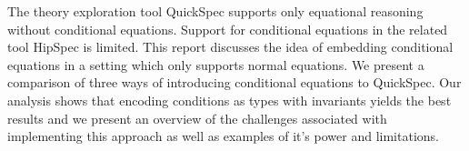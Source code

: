 The theory exploration tool QuickSpec
supports only equational reasoning without
conditional equations. Support for conditional
equations in the related tool HipSpec is limited.
This report discusses the idea of embedding conditional
equations in a setting which only supports normal equations.
We present a comparison of three ways of introducing
conditional equations to QuickSpec.
Our analysis shows that encoding conditions as types with invariants 
yields the best results and we present an overview of
the challenges associated with implementing
this approach as well as examples
of it's power and limitations.
